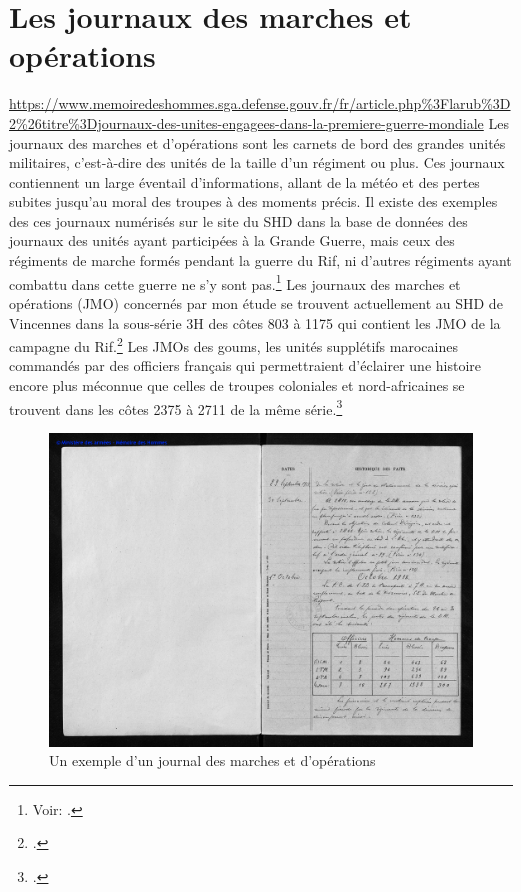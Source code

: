 \section{Les journaux des marches et opérations}
\urldef\myurl\url{https://www.memoiredeshommes.sga.defense.gouv.fr/fr/article.php%3Flarub%3D2%26titre%3Djournaux-des-unites-engagees-dans-la-premiere-guerre-mondiale}
Les journaux des marches et d'opérations sont les carnets de bord des grandes unités militaires, c'est-à-dire des unités de la taille d'un régiment ou plus. Ces journaux contiennent un large éventail d'informations, allant de la météo et des pertes subites jusqu’au moral des troupes à des moments précis. Il existe des exemples des ces journaux numérisés sur le site du SHD dans la base de données des journaux des unités ayant participées à la Grande Guerre, mais ceux des régiments de marche formés pendant la guerre du Rif, ni d’autres régiments ayant combattu dans cette guerre ne s’y sont pas.\footnote{Voir: \myurl.} Les journaux des marches et opérations (JMO) concernés par mon étude se trouvent actuellement au SHD de Vincennes dans la sous-série 3H des côtes 803 à 1175 qui contient les JMO de la campagne du Rif.\footcites[30]{shd2002} Les JMOs des goums, les unités supplétifs marocaines commandés par des officiers français qui permettraient d'éclairer une histoire encore plus méconnue que celles de troupes coloniales et nord-africaines se trouvent dans les côtes 2375 à 2711 de la même série.\footcites[33]{shd2002}\begin{figure}[h!]
    \begin{center}
      \includegraphics[scale=0.8]{Images/exemplejmo.jpeg}
        \caption[Note d'image]{Un exemple d'un journal des marches et d'opérations\footnotemark}
    \label{fig:JMO}
    \end{center}
  \end{figure}

